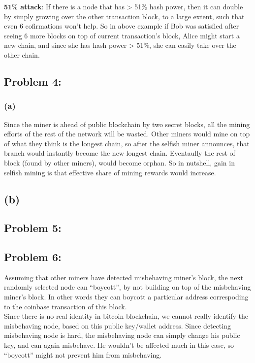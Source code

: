 \documentclass[a4paper]{article}
\begin{document}
\textbf{$\mathbf{51 \%}$ attack}: If there is a node that has > 51\% hash power, then it can double by
simply growing over the other transaction block, to a large extent, such that even 6 cofirmations won't help.
So in above example if Bob was satisfied after seeing 6 more blocks on top of current transaction's block, Alice
might start a new chain, and since she has hash power > 51\%, she can easily take over the other chain.

\subsection*{Problem 4:}
\subsubsection*{(a)}
Since the miner is ahead of public blockchain by two secret blocks, all the mining efforts of the rest of the network
will be wasted. Other miners would mine on top of what they think is the longest chain, so after the
selfish miner announces, that branch would instantly become the new longest chain. Eventaully 
the rest of block (found by other miners), would become orphan. So in nutshell, gain in selfish mining
is that effective share of mining rewards would increase.

\subsection*{(b)}


\subsection*{Problem 5:}


\subsection*{Problem 6:}
Assuming that other miners have detected misbehaving miner's block, the next randomly selected node can
``boycott'', by not building on top of the misbehaving miner's block. In other words they can boycott
a particular address correspoding to the coinbase transaction of this block. \\

Since there is no real identity in
bitcoin blockchain, we cannot really identify the misbehaving node, based on this public key/wallet address.
Since detecting misbehaving node is hard, the misbehaving node can simply change his public key, and
can again misbehave. He wouldn't be affected much in this case, so ``boycott'' might not prevent him from misbehaving.
\end{document}
